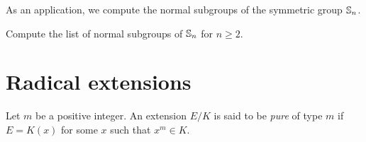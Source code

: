 As an application, we compute the normal subgroups 
of the symmetric group $\mathbb{S}_n$. 

\begin{exercise}
    Compute the list of normal subgroups of $\mathbb{S}_n$ for $n\geq2$. 
\end{exercise}

%
%
%
%
%
%
%
%    


\section{Radical extensions}

\begin{definition}
    Let $m$ be a positive integer. 
    An extension $E/K$ is said to be \emph{pure} of type $m$ if 
    $E=K(x)$ for some $x$ such that $x^m\in K$. 
\end{definition}

